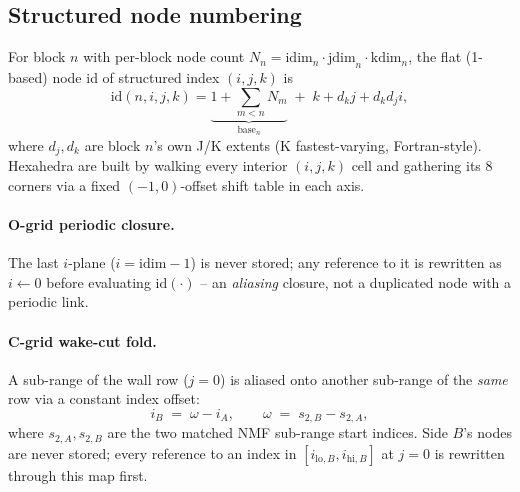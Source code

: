 \documentclass[11pt]{article}
\begin{document}
\subsection{Structured node numbering}
\label{sec:c2s-numbering}
For block \(n\) with per-block node count \(N_n = \text{idim}_n \cdot \text{jdim}_n \cdot \text{kdim}_n\),
the flat (1-based) node id of structured index \((i,j,k)\) is
\begin{equation}
\mathrm{id}(n,i,j,k) = \underbrace{1 + \sum_{m<n} N_m}_{\text{base}_n} \;+\; k + d_k j + d_k d_j i,
\end{equation}
where \(d_j, d_k\) are block \(n\)'s own J/K extents (K fastest-varying,
Fortran-style). Hexahedra are built by walking every interior
\((i,j,k)\) cell and gathering its 8 corners via a fixed
\((-1,0)\)-offset shift table in each axis.

\paragraph{O-grid periodic closure.} The last \(i\)-plane
(\(i=\text{idim}-1\)) is never stored; any reference to it is rewritten
as \(i \gets 0\) before evaluating \(\mathrm{id}(\cdot)\) -- an
\emph{aliasing} closure, not a duplicated node with a periodic link.

\paragraph{C-grid wake-cut fold.} A sub-range of the wall row
(\(j=0\)) is aliased onto another sub-range of the \emph{same} row via
a constant index offset:
\begin{equation}
i_B \;=\; \omega - i_A, \qquad \omega \;=\; s_{2,B} - s_{2,A},
\end{equation}
where \(s_{2,A}, s_{2,B}\) are the two matched NMF sub-range start
indices. Side \(B\)'s nodes are never stored; every reference to an
index in \([i_{\mathrm{lo},B}, i_{\mathrm{hi},B}]\) at \(j=0\) is
rewritten through this map first.
\end{document}
